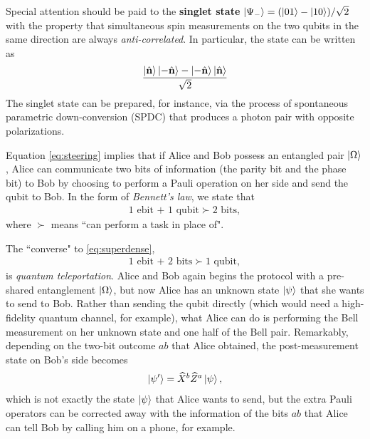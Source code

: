Special attention should be paid to the {\bf singlet state} $\ket{\Psi_-} = (\ket{01}-\ket{10})/\sqrt{2}$ with the property that simultaneous spin measurements on the two qubits in the same direction are always \emph{anti-correlated}. In particular, the state can be written as
\begin{align}
	\frac{\ket{\hat{\vb n}}\ket{-\hat{\vb n}} - \ket{-\hat{\vb n}}\ket{\hat{\vb n}}}{\sqrt 2}
\end{align}
The singlet state can be prepared, for instance, via the process of spontaneous parametric down-conversion (SPDC) that produces a photon pair with opposite polarizations.



\begin{example}\leavevmode
	
	Equation \eqref{eq:steering} implies that if Alice and Bob possess an entangled pair $\ket{\Omega}$, Alice can communicate two bits of information (the parity bit and the phase bit) to Bob by choosing to perform a Pauli operation on her side and send the qubit to Bob. In the form of \emph{Bennett's law}, we state that
	\begin{align}\label{eq:superdense}
		\textrm{1 ebit + 1 qubit} \succ \textrm{2 bits},
	\end{align} 
	where $\succ$ means ``can perform a task in place of".
\end{example}

\begin{example}[\bf Teleportation]\leavevmode
	
	The ``converse" to \eqref{eq:superdense},
		\begin{align}\label{eq:teleport}
		\textrm{1 ebit + 2 bits} \succ \textrm{1 qubit},
	\end{align} 
	is \emph{quantum teleportation}. Alice and Bob again begins the protocol with a pre-shared entanglement $\ket{\Omega}$, but now Alice has an unknown state $\ket{\psi}$ that she wants to send to Bob. Rather than sending the qubit directly (which would need a high-fidelity quantum channel, for example), what Alice can do is performing the Bell measurement on her unknown state and one half of the Bell pair. Remarkably, depending on the two-bit outcome $ab$ that Alice obtained, the post-measurement state on Bob's side becomes
	\begin{align}
		\ket{\psi'} = \widehat{X}^b \widehat{Z}^a \ket{\psi},
	\end{align}
which is not exactly the state $\ket{\psi}$ that Alice wants to send, but the extra Pauli operators can be corrected away with the information of the bits $ab$ that Alice can tell Bob by calling him on a phone, for example.
\end{example}
	
